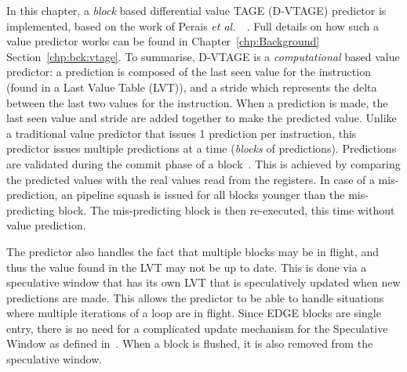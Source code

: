 In this chapter, a \textit{block} based differential value TAGE (D-VTAGE) predictor is implemented, based on the work of Perais {\it et al.~}~\cite{peraisBeBop2015}.
Full details on how such a value predictor works can be found in Chapter~\ref{chp:Background} Section~\ref{chp:bck:vtage}.
To summarise, D-VTAGE is a \textit{computational} based value predictor: a prediction is composed of the last seen value for the instruction (found in a Last Value Table (LVT)), and a stride which represents the delta between the last two values for the instruction.
When a prediction is made, the last seen value and stride are added together to make the predicted value.
Unlike a traditional value predictor that issues 1 prediction per instruction, this predictor issues multiple predictions at a time (\textit{blocks} of predictions).
Predictions are validated during the commit phase of a block~\cite{peraisVTAGE2014}.
This is achieved by comparing the predicted values with the real values read from the registers.
In case of a mis-prediction, an pipeline squash is issued for all blocks younger than the mis-predicting block.
The mis-predicting block is then re-executed, this time without value prediction.

The predictor also handles the fact that multiple blocks may be in flight, and thus the value found in the LVT may not be up to date.
This is done via a speculative window that has its own LVT that is speculatively updated when new predictions are made.
This allows the predictor to be able to handle situations where multiple iterations of a loop are in flight.
Since EDGE blocks are single entry, there is no need for a complicated update mechanism for the Speculative Window as defined in~\cite{peraisBeBop2015}.
When a block is flushed, it is also removed from the speculative window.





